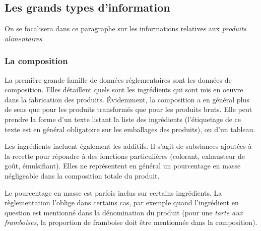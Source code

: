             \subsection{Les grands types d'information}
            \label{info_produit}

            On se focalisera dans ce paragraphe sur les informations relatives aux \emph{produits alimentaires}.

                \subsubsection{La composition}
                \label{composition}

                La première grande famille de données réglementaires sont les données de composition.
                Elles détaillent quels sont les ingrédients qui sont mis en oeuvre dans la fabrication des produits.
                \'{E}videmment, la composition a en général plus de sens que pour les produits transformés que pour les produits bruts.
                Elle peut prendre la forme d'un texte listant la liste des ingrédients (l'étiquetage de ce texte est en général obligatoire sur les emballages des produits), ou d'un tableau.
                
                Les ingrédients incluent également les additifs.
                Il s'agit de substances ajoutées à la recette pour répondre à des fonctions particulières (colorant, exhausteur de goût, émulsifiant).
                Elles ne représentent en général un pourcentage en masse négligeable dans la composition totale du produit.

                Le pourcentage en masse est parfois inclus sur certains ingrédients. 
                La règlementation l'oblige dans certains cas, par exemple quand l'ingrédient en question est mentionné dans la dénomination du produit (pour une \emph{tarte aux framboises}, la proportion de framboise doit être mentionnée dans la composition).


